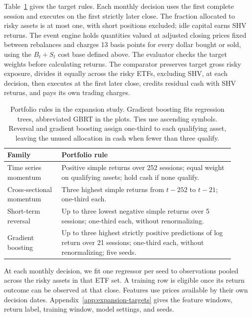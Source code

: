 \documentclass{article}
\begin{document}
Table~\ref{tab:expansion-design} gives the target rules. Each monthly decision
uses the first complete session and executes on the first strictly later close.
The fraction allocated to risky assets is at most one, with short positions excluded; idle capital earns SHV returns. The event
engine holds quantities valued at adjusted closing prices fixed between rebalances and charges 13
basis points for every dollar bought or sold, using the $B_t+S_t$ cost base defined above. The evaluator checks the target weights before calculating returns. The comparator
preserves target gross risky exposure, divides it equally across the risky ETFs, excluding SHV, at
each decision, then executes at the first later close, credits residual cash with SHV returns, and pays its
own trading charges.

\begin{table}[t]
  \caption{Portfolio rules in the expansion study. Gradient boosting fits regression trees, abbreviated GBRT in the plots. Ties use ascending symbols. Reversal and gradient boosting assign one-third to each qualifying asset, leaving the unused allocation in cash when fewer than three qualify.}
  \label{tab:expansion-design}
  \centering
  \begin{tabular}{>{\raggedright\arraybackslash}p{0.22\linewidth}
                  >{\raggedright\arraybackslash}p{0.70\linewidth}}
    \toprule
    Family & Portfolio rule \\
    \midrule
    Time series momentum & Positive simple returns over 252 sessions; equal weight on qualifying assets; hold cash if none qualify. \\
    Cross-sectional momentum & Three highest simple returns from $t-252$ to $t-21$; one-third each. \\
    Short-term reversal & Up to three lowest negative simple returns over 5 sessions; one-third each, without renormalizing. \\
    Gradient boosting & Up to three highest strictly positive predictions of log return over 21 sessions; one-third each, without renormalizing; five seeds. \\
    \bottomrule
  \end{tabular}
\end{table}

At each monthly decision, we fit one regressor per seed to observations pooled across the risky assets in that ETF set. A training row is eligible once its return outcome can be observed at that close. Features use prices available by their own decision dates. Appendix~\ref{app:expansion-targets} gives the feature windows, return label, training window, model settings, and seeds.
\end{document}

